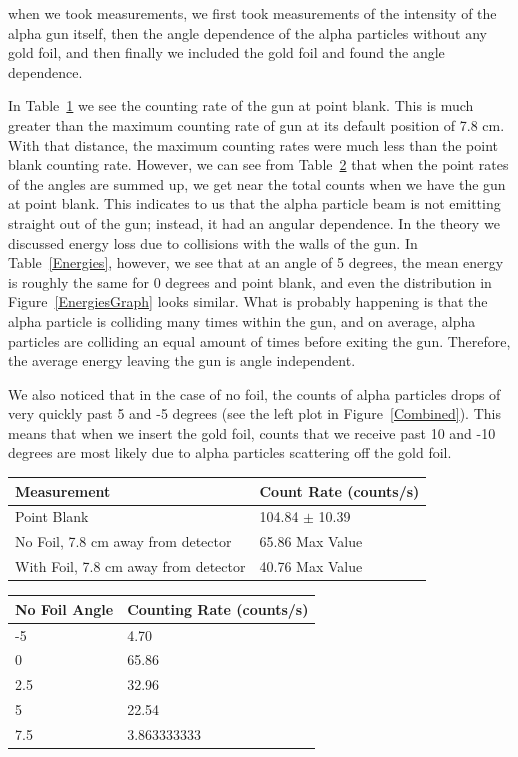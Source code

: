 when we took measurements, we first took measurements of the intensity of the alpha gun itself, then the angle dependence of the alpha particles without any gold foil, and then finally we included the gold foil and found the angle dependence. 

In Table~\ref{PointBlank} we see the counting rate of the gun at point blank. This is much greater than the maximum counting rate of gun at its default position of 7.8 cm. With that distance, the maximum counting rates were much less than the point blank counting rate. However, we can see from Table~\ref{NoFoilTable} that when the point rates of the angles are summed up, we get near the total counts when we have the gun at point blank. This indicates to us that the alpha particle beam is not emitting straight out of the gun; instead, it had an angular dependence. In the theory we discussed energy loss due to collisions with the walls of the gun. In Table~\ref{Energies}, however, we see that at an angle of 5 degrees, the mean energy is roughly the same for 0 degrees and point blank, and even the distribution in Figure~\ref{EnergiesGraph} looks similar. What is probably happening is that the alpha particle is colliding many times within the gun, and on average, alpha particles are colliding an equal amount of times before exiting the gun. Therefore, the average energy leaving the gun is angle independent. 

We also noticed that in the case of no foil, the counts of alpha particles drops of very quickly past 5 and -5 degrees (see the left plot in Figure~\ref{Combined}). This means that when we insert the gold foil, counts that we receive past 10 and -10 degrees are most likely due to alpha particles scattering off the gold foil.

\begin{table}[h]
\begin{tabular}{|l|l|}
\hline 
Measurement & Count Rate (counts/s)                \\ \hline \hline
Point Blank & 104.84 $\pm$ 10.39                        \\
No Foil, 7.8 cm away from detector & 65.86 Max Value    \\
With Foil, 7.8 cm away from detector & 40.76 Max Value  \\ \hline         
\end{tabular}
\label{PointBlank}
\end{table}

\begin{table}[h]
\begin{tabular}{|l|l|}
\hline
No Foil Angle & Counting Rate (counts/s) \\ \hline \hline
-5            & 4.70                          \\
0             & 65.86                         \\
2.5           & 32.96                         \\
5             & 22.54                         \\
7.5           & 3.863333333                   \\ \hline
\end{tabular}
\label{NoFoilTable}
\end{table}

